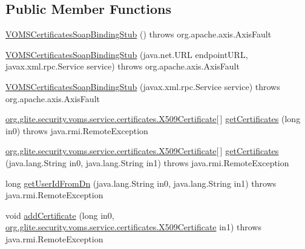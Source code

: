\subsection*{Public Member Functions}
\begin{DoxyCompactItemize}
\item 
\hyperlink{classorg_1_1glite_1_1security_1_1voms_1_1service_1_1certificates_1_1VOMSCertificatesSoapBindingStub_ad521bc2a4c630b7de9596cd964db61c6}{VOMSCertificatesSoapBindingStub} ()  throws org.apache.axis.AxisFault 
\item 
\hyperlink{classorg_1_1glite_1_1security_1_1voms_1_1service_1_1certificates_1_1VOMSCertificatesSoapBindingStub_a459f2981599b444cea036d78906d85b4}{VOMSCertificatesSoapBindingStub} (java.net.URL endpointURL, javax.xml.rpc.Service service)  throws org.apache.axis.AxisFault 
\item 
\hyperlink{classorg_1_1glite_1_1security_1_1voms_1_1service_1_1certificates_1_1VOMSCertificatesSoapBindingStub_a502765c048b3b7c589b08e59bb37b36a}{VOMSCertificatesSoapBindingStub} (javax.xml.rpc.Service service)  throws org.apache.axis.AxisFault 
\item 
\hyperlink{classorg_1_1glite_1_1security_1_1voms_1_1service_1_1certificates_1_1X509Certificate}{org.glite.security.voms.service.certificates.X509Certificate}\mbox{[}$\,$\mbox{]} \hyperlink{classorg_1_1glite_1_1security_1_1voms_1_1service_1_1certificates_1_1VOMSCertificatesSoapBindingStub_aba3f40bf0179e4b66b8f0dd213d477e6}{getCertificates} (long in0)  throws java.rmi.RemoteException 
\item 
\hyperlink{classorg_1_1glite_1_1security_1_1voms_1_1service_1_1certificates_1_1X509Certificate}{org.glite.security.voms.service.certificates.X509Certificate}\mbox{[}$\,$\mbox{]} \hyperlink{classorg_1_1glite_1_1security_1_1voms_1_1service_1_1certificates_1_1VOMSCertificatesSoapBindingStub_a92131b1b85847d21f8c3cd9a89c2d430}{getCertificates} (java.lang.String in0, java.lang.String in1)  throws java.rmi.RemoteException 
\item 
long \hyperlink{classorg_1_1glite_1_1security_1_1voms_1_1service_1_1certificates_1_1VOMSCertificatesSoapBindingStub_a3095f49424d8e410e62ecfd90248d3d8}{getUserIdFromDn} (java.lang.String in0, java.lang.String in1)  throws java.rmi.RemoteException 
\item 
void \hyperlink{classorg_1_1glite_1_1security_1_1voms_1_1service_1_1certificates_1_1VOMSCertificatesSoapBindingStub_ab4c9ad4a8d1a1007bfcb408f57669a5e}{addCertificate} (long in0, \hyperlink{classorg_1_1glite_1_1security_1_1voms_1_1service_1_1certificates_1_1X509Certificate}{org.glite.security.voms.service.certificates.X509Certificate} in1)  throws java.rmi.RemoteException 

\end{DoxyCompactItemize}
